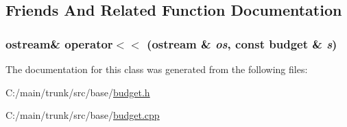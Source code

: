 \subsection{Friends And Related Function Documentation}
\hypertarget{classbudget_a0f6087201fd909afbaebd5cb15504f1e}{
\subsubsection[{operator$<$$<$}]{\setlength{\rightskip}{0pt plus 5cm}ostream\& operator$<$$<$ (ostream \& {\em os}, \/  const {\bf budget} \& {\em s})}}
\label{classbudget_a0f6087201fd909afbaebd5cb15504f1e}


The documentation for this class was generated from the following files:\begin{DoxyCompactItemize}
\item 
C:/main/trunk/src/base/\hyperlink{budget_8h}{budget.h}\item 
C:/main/trunk/src/base/\hyperlink{budget_8cpp}{budget.cpp}\end{DoxyCompactItemize}
